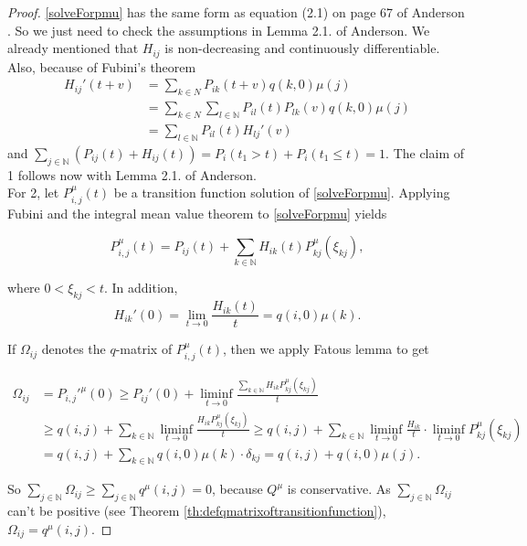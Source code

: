 \documentclass[12pt,a4paper]{scrartcl}
\numberwithin{equation}{section}
\newcommand{\N}{\mathbb{N}} %
\begin{document}
\begin{proof}
\eqref{solveForpmu} has the same form as equation (2.1) on page 67 of Anderson \cite{anderson}. So we just need to check the assumptions in Lemma 2.1. of Anderson. We already mentioned that $H_{ij}$ is non-decreasing and continuously differentiable. 
Also, because of Fubini's theorem 
\begin{align*} H_{ij}'\left(t+v\right) 
&= \sum_{k \in N} P_{ik}\left(t+v\right) q\left(k,0\right) \mu\left(j\right) \\
&= \sum_{k \in N} \sum_{l \in \N} P_{il}\left(t\right) P_{lk}\left(v\right) q\left(k,0\right) \mu\left(j\right) \\
&= \sum_{l \in \N} P_{il}\left(t\right) H_{lj}' \left(v\right) 
\end{align*}
and $ \sum_{j \in \N} \left(P_{ij}\left(t\right) + H_{ij}\left(t\right) \right) = P_i\left(t_1 > t\right) + P_i\left(t_1 \leq t\right) = 1. $
The claim of 1 follows now with Lemma 2.1. of Anderson. \\[2ex]

For 2, let $P_{i,j}^{\mu}\left(t\right) $ be a transition function solution of \eqref{solveForpmu}. Applying Fubini and the integral mean value theorem to \eqref{solveForpmu} yields

$$ P_{i,j}^{\mu}\left(t\right) = P_{ij}\left(t\right) + \sum_{k \in \N} H_{ik}\left(t\right) P_{kj}^{\mu}\left(\xi_{kj}\right), $$

where $ 0 < \xi_{kj} < t $.
In addition,
$$ H_{ik}' \left(0\right) = \lim_{t \to 0} \frac{H_{ik}\left(t\right)}{t} = q\left(i,0\right) \mu\left(k\right). $$

If $ \Omega_{ij} $ denotes the $q$-matrix of $ P_{i,j}^{\mu}\left(t\right) $, then we apply Fatous lemma to get

\begin{align*}
\Omega_{ij} &= P_{i,j}'^{\mu}\left(0\right) \geq P_{ij}'\left(0\right) + \liminf_{t \to 0} \frac{\sum_{k \in \N}H_{ik} P_{kj}^{\mu}\left(\xi_{kj}\right) }{t} \\
&\geq q\left(i,j\right)+  \sum_{k \in \N} \liminf_{t \to 0} \frac{H_{ik} P_{kj}^{\mu}\left(\xi_{kj}\right) }{t} \geq q\left(i,j\right)+  \sum_{k \in \N} \liminf_{t \to 0} \frac{H_{ik}}{t} \cdot \liminf_{t \to 0} P_{kj}^{\mu}\left(\xi_{kj}\right)\\
&= q\left(i,j\right)+  \sum_{k \in \N} q\left(i,0\right) \mu\left(k\right) \cdot \delta_{kj} = q\left(i,j\right) + q\left(i,0\right) \mu\left(j\right).
\end{align*}

So $ \sum_{j \in \N} \Omega_{ij} \geq \sum_{j \in \N} q^{\mu}\left(i,j\right) = 0 $, because 
$Q^{\mu}$ is conservative. As $\sum_{j \in \N} \Omega_{ij}$ can't be positive (see Theorem \ref{th:defqmatrixoftransitionfunction}), $ \Omega_{ij} = q^{\mu}\left(i,j\right)$.
\end{proof}
\end{document}
